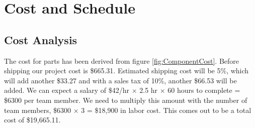 \documentclass[journal,onecolumn, draftclsnofoot, 12pt]{IEEEtran}
\begin{document}
\section{Cost and Schedule}
\label{sec:cost}

\subsection{Cost Analysis}
The cost for parts has been derived from figure \ref{fig:ComponentCost}. Before shipping our project cost is \$665.31. Estimated shipping cost will be 5\%, which will add another \$33.27 and with a sales tax of 10\%, another \$66.53 will be added. We can expect a salary of \$42/hr $\times$ 2.5 hr $\times$ 60 hours to complete = \$6300 per team member. We need to multiply this amount with the number of team members, \$6300 $\times$ 3 = \$18,900 in labor cost. This comes out to be a total cost of \$19,665.11.
\end{document}
